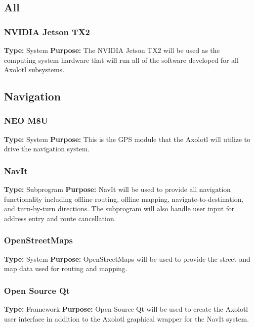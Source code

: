 \documentclass[onecolumn, draftclsnofoot,10pt, compsoc]{IEEEtran}
\begin{document}
\subsection{All}
\subsubsection{NVIDIA Jetson TX2}
\textbf{Type:} System  \newline
\textbf{Purpose:} The NVIDIA Jetson TX2 will be used as the computing system hardware that will run all of the software developed for all Axolotl subsystems.

\subsection{Navigation}
\subsubsection{NEO M8U}
\textbf{Type:} System \newline
\textbf{Purpose:} This is the GPS module that the Axolotl will utilize to drive the navigation system. 

\subsubsection{NavIt}
\textbf{Type:} Subprogram \newline
\textbf{Purpose:} NavIt will be used to provide all navigation functionality including offline routing, offline mapping, navigate-to-destination, and turn-by-turn directions. The subprogram will also handle user input for address entry and route cancellation.

\subsubsection{OpenStreetMaps}
\textbf{Type:} System \newline
\textbf{Purpose:} OpenStreetMaps will be used to provide the street and map data used for routing and mapping.

\subsubsection{Open Source Qt}
\textbf{Type:} Framework \newline
\textbf{Purpose:} Open Source Qt will be used to create the Axolotl user interface in addition to the Axolotl graphical wrapper for the NavIt system.
\end{document}
